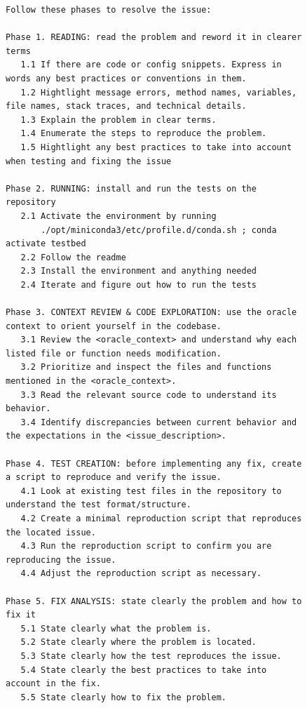 \begin{figure}[!h]
    \centering
\begin{tcolorbox}[colback=red!6!white, colframe=red!75!black, title={\small User Prompt for OpenHands Issue Resolution Agent Augmented with Oracle Locations}]
\begin{lstlisting}[basicstyle=\fontsize{7.7}{8}\ttfamily]
Follow these phases to resolve the issue:

Phase 1. READING: read the problem and reword it in clearer terms
   1.1 If there are code or config snippets. Express in words any best practices or conventions in them.
   1.2 Hightlight message errors, method names, variables, file names, stack traces, and technical details.
   1.3 Explain the problem in clear terms.
   1.4 Enumerate the steps to reproduce the problem.
   1.5 Hightlight any best practices to take into account when testing and fixing the issue

Phase 2. RUNNING: install and run the tests on the repository
   2.1 Activate the environment by running  
       ./opt/miniconda3/etc/profile.d/conda.sh ; conda activate testbed
   2.2 Follow the readme
   2.3 Install the environment and anything needed
   2.4 Iterate and figure out how to run the tests

Phase 3. CONTEXT REVIEW & CODE EXPLORATION: use the oracle context to orient yourself in the codebase.
   3.1 Review the <oracle_context> and understand why each listed file or function needs modification.
   3.2 Prioritize and inspect the files and functions mentioned in the <oracle_context>.
   3.3 Read the relevant source code to understand its behavior.
   3.4 Identify discrepancies between current behavior and the expectations in the <issue_description>.

Phase 4. TEST CREATION: before implementing any fix, create a script to reproduce and verify the issue.
   4.1 Look at existing test files in the repository to understand the test format/structure.
   4.2 Create a minimal reproduction script that reproduces the located issue.
   4.3 Run the reproduction script to confirm you are reproducing the issue.
   4.4 Adjust the reproduction script as necessary.

Phase 5. FIX ANALYSIS: state clearly the problem and how to fix it
   5.1 State clearly what the problem is.
   5.2 State clearly where the problem is located.
   5.3 State clearly how the test reproduces the issue.
   5.4 State clearly the best practices to take into account in the fix.
   5.5 State clearly how to fix the problem.


\end{lstlisting}
\end{tcolorbox}
\end{figure}
